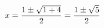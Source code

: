 \documentclass[preview]{standalone}
\begin{document}
\begin{align*}
\special{dvisvgm:raw <g id='unique000'>}x=\frac{1\pm\sqrt{1+4}}{2}=\frac{1\pm\sqrt5}{2}\special{dvisvgm:raw </g>}
\end{align*}
\end{document}
